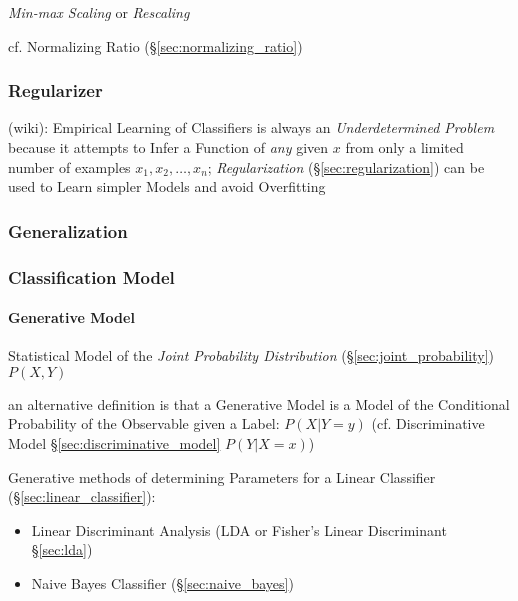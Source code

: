 \emph{Min-max Scaling} or \emph{Rescaling}

\fist cf. Normalizing Ratio (\S\ref{sec:normalizing_ratio})



\subsubsection{Regularizer}\label{sec:regularizer}

(wiki): Empirical Learning of Classifiers is always an \emph{Underdetermined
  Problem} because it attempts to Infer a Function of \emph{any} given $x$ from
only a limited number of examples $x_1, x_2, \ldots, x_n$; \emph{Regularization}
(\S\ref{sec:regularization}) can be used to Learn simpler Models and avoid
Overfitting



\subsubsection{Generalization}\label{sec:generalization}


\subsubsection{Classification Model}\label{sec:classification_model}

\paragraph{Generative Model}\label{sec:generative_model}\hfill

Statistical Model of the \emph{Joint Probability Distribution}
(\S\ref{sec:joint_probability}) $P(X,Y)$

an alternative definition is that a Generative Model is a Model of the
Conditional Probability of the Observable given a Label: $P(X|Y = y)$
(cf. Discriminative Model \S\ref{sec:discriminative_model} $P(Y|X = x)$)

Generative methods of determining Parameters for a Linear Classifier
(\S\ref{sec:linear_classifier}):
\begin{itemize}
  \item Linear Discriminant Analysis (LDA or Fisher's Linear Discriminant
    \S\ref{sec:lda})
  \item Naive Bayes Classifier (\S\ref{sec:naive_bayes})
\end{itemize}

